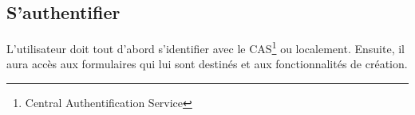 \documentclass{sigplanconf}
\begin{document}
\noindent\begin{minipage}{\linewidth}%
\label{listScenarios}
\end{minipage}

\subsection{S'authentifier}
L’utilisateur doit tout d’abord s'identifier avec le CAS\footnote{Central Authentification Service} ou localement. Ensuite, il aura accès aux formulaires qui lui sont destinés et aux fonctionnalités de création.
\end{document}

